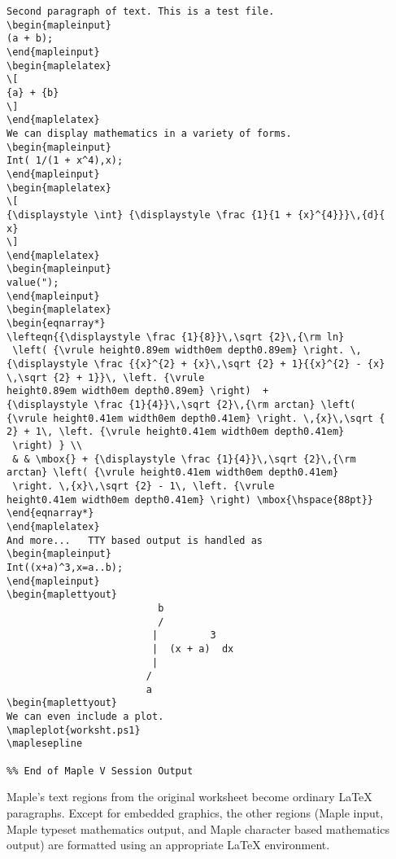 {\begin{verbatim}
Second paragraph of text. This is a test file.
\begin{mapleinput}
(a + b);
\end{mapleinput}
\begin{maplelatex}
\[
{a} + {b}
\]
\end{maplelatex}
We can display mathematics in a variety of forms.
\begin{mapleinput}
Int( 1/(1 + x^4),x);
\end{mapleinput}
\begin{maplelatex}
\[
{\displaystyle \int} {\displaystyle \frac {1}{1 + {x}^{4}}}\,{d}{
x}
\]
\end{maplelatex}
\begin{mapleinput}
value(");
\end{mapleinput}
\begin{maplelatex}
\begin{eqnarray*}
\lefteqn{{\displaystyle \frac {1}{8}}\,\sqrt {2}\,{\rm ln}
 \left( {\vrule height0.89em width0em depth0.89em} \right. \,
{\displaystyle \frac {{x}^{2} + {x}\,\sqrt {2} + 1}{{x}^{2} - {x}
\,\sqrt {2} + 1}}\, \left. {\vrule 
height0.89em width0em depth0.89em} \right)  + 
{\displaystyle \frac {1}{4}}\,\sqrt {2}\,{\rm arctan} \left( 
{\vrule height0.41em width0em depth0.41em} \right. \,{x}\,\sqrt {
2} + 1\, \left. {\vrule height0.41em width0em depth0.41em}
 \right) } \\
 & & \mbox{} + {\displaystyle \frac {1}{4}}\,\sqrt {2}\,{\rm 
arctan} \left( {\vrule height0.41em width0em depth0.41em}
 \right. \,{x}\,\sqrt {2} - 1\, \left. {\vrule 
height0.41em width0em depth0.41em} \right) \mbox{\hspace{88pt}}
\end{eqnarray*}
\end{maplelatex}
And more...   TTY based output is handled as
\begin{mapleinput}
Int((x+a)^3,x=a..b);
\end{mapleinput}
\begin{maplettyout}
                          b
                          /
                         |         3
                         |  (x + a)  dx
                         |
                        /
                        a
\begin{maplettyout}
We can even include a plot.
\mapleplot{worksht.ps1}
\maplesepline

%% End of Maple V Session Output
\end{verbatim}

Maple's text regions from the original worksheet become ordinary
\LaTeX{} paragraphs.  Except for embedded graphics, the other regions
(Maple input, Maple typeset mathematics output, 
and Maple character based mathematics output)
are formatted using an appropriate \LaTeX{} environment. 

}
